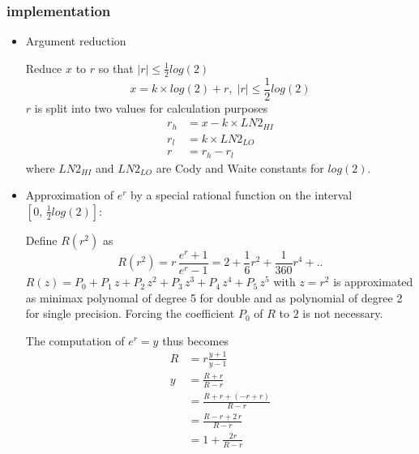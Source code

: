 \documentclass[10pt,a4paper]{article}
\numberwithin{equation}{subsection}
\begin{document}
\subsubsection{implementation}
\begin{itemize}
\item Argument reduction

    Reduce $x$ to $r$ so that $ |r| \le \frac{1}{2} log(2) $
    \begin{equation}
        x = k \times log(2) + r, \; |r| \le \frac{1}{2} log(2)
    \end{equation}
    $r$ is split into two values for calculation purposes
    \[
       \begin{aligned}
       r_h &= x - k \times LN2_{HI} \\
       r_l &= k \times LN2_{LO} \\
       r &= r_h - r_l
       \end{aligned}
    \]
    where $LN2_{HI}$ and $LN2_{LO}$ are Cody and Waite constants for $log(2)$.

\item Approximation of $e^r$ by a special rational function on the interval
    $[0,\,\frac{1}{2}log(2)]$:

    Define $ R(r^2) $ as
    \begin{equation}
        R(r^2) = r \, \frac{e^r+1}{e^r-1}
               = 2 + \frac{1}{6}r^2 + \frac{1}{360}r^4 + ..
    \end{equation}
    $ R(z) = P_0 + P_1\, z + P_2\,z^2 + P_3\,z^3 + P_4\,z^4+ P_5\, z^5$
    with $z = r^2$ is approximated as minimax polynomal of degree 5 for double
    and as polynomial of degree 2 for single precision.
    Forcing the coefficient $P_0$ of $R$ to $2$ is not necessary.

    The computation of $e^r=y$ thus becomes
    \[
        \begin{aligned}
            R &= r \frac{y+1}{y-1} \\
            y &= \frac{R+r}{R-r} \\
              &= \frac{R+r+(-r+r)}{R-r} \\
              &= \frac{R-r+2\,r}{R-r}\\
              &= 1 + \frac{2 r}{R-r}
        \end{aligned}
    \]


\end{itemize}
\end{document}
